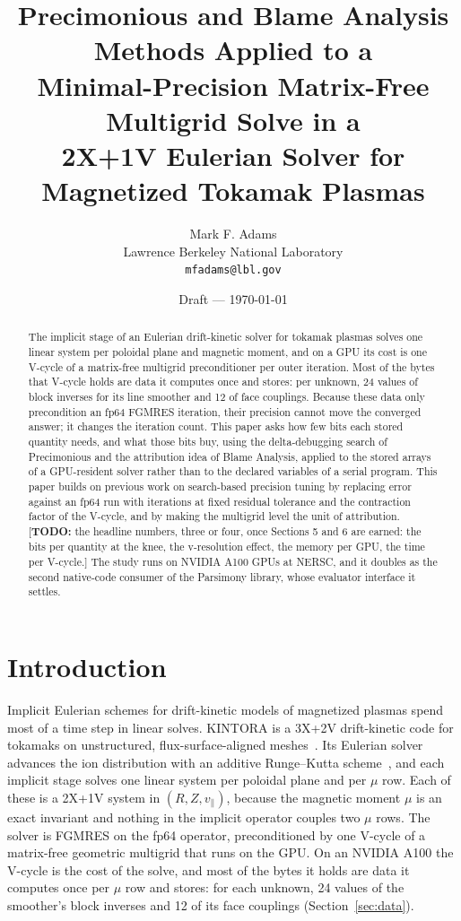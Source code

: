 \documentclass[11pt]{article}
\title{Precimonious and Blame Analysis Methods Applied to a\\
       Minimal-Precision Matrix-Free Multigrid Solve in a\\
       2X+1V Eulerian Solver for Magnetized Tokamak Plasmas}
\author{Mark F. Adams\\
        \small Lawrence Berkeley National Laboratory\\
        \small \texttt{mfadams@lbl.gov}}
\date{Draft --- \today}
\newcommand{\todo}[1]{\textcolor{red!70!black}{\small[\textbf{TODO:} #1]}}
\newcommand{\vpar}{v_\parallel}
\begin{document}
\maketitle

\begin{abstract}
The implicit stage of an Eulerian drift-kinetic solver for tokamak plasmas solves one linear
system per poloidal plane and magnetic moment, and on a GPU its cost is one V-cycle of a
matrix-free multigrid preconditioner per outer iteration.  Most of the bytes that V-cycle
holds are data it computes once and stores: per unknown, 24 values of block inverses for its
line smoother and 12 of face couplings.  Because these data only precondition an fp64
FGMRES iteration, their precision cannot move the converged answer; it changes the iteration
count.  This paper asks how few bits each stored quantity needs, and what those bits buy,
using the delta-debugging search of Precimonious and the attribution idea of Blame Analysis,
applied to the stored arrays of a GPU-resident solver rather than to the declared variables of
a serial program.  This paper builds on previous work on search-based precision tuning by
replacing error against an fp64 run with iterations at fixed residual tolerance and the
contraction factor of the V-cycle, and by making the multigrid level the unit of attribution.
\todo{the headline numbers, three or four, once Sections 5 and 6 are earned: the bits per
quantity at the knee, the v-resolution effect, the memory per GPU, the time per V-cycle.}
The study runs on NVIDIA A100 GPUs at NERSC, and it doubles as the second native-code
consumer of the Parsimony library, whose evaluator interface it settles.
\end{abstract}

\section{Introduction}
\label{sec:intro}

Implicit Eulerian schemes for drift-kinetic models of magnetized plasmas spend most of a time
step in linear solves.  KINTORA is a 3X+2V drift-kinetic code for tokamaks on unstructured,
flux-surface-aligned meshes~\cite{kintoramethods,kintorahpc}.  Its Eulerian solver advances the
ion distribution with an additive Runge--Kutta scheme~\cite{kennedycarpenter2003}, and each
implicit stage solves one linear system per poloidal plane and per $\mu$ row.  Each of these is a
2X+1V system in $(R, Z, \vpar)$, because the magnetic moment $\mu$ is an exact invariant and
nothing in the implicit operator couples two $\mu$ rows.  The solver is FGMRES on the fp64
operator, preconditioned by one V-cycle of a matrix-free geometric multigrid that runs on the
GPU.  On an NVIDIA A100 the V-cycle is the cost of the solve, and most of the bytes it holds are
data it computes once per $\mu$ row and stores: for each unknown, 24 values of the smoother's
block inverses and 12 of its face couplings (Section~\ref{sec:data}).
\end{document}
